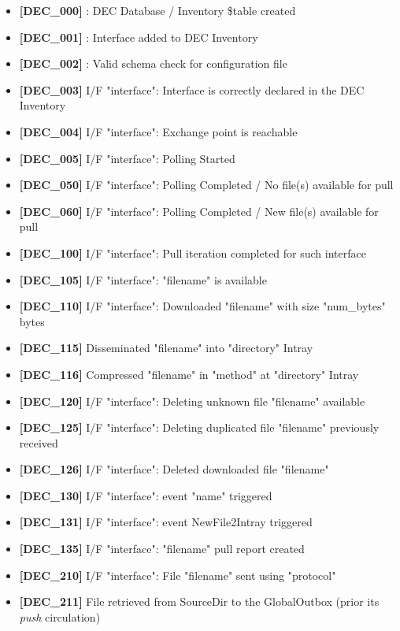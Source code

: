 \documentclass[dec_sum_main.tex]{subfiles}
\begin{document}
\begin{itemize}
    \item \textbf{[DEC\_000]} : DEC Database / Inventory \$table created
    \item \textbf{[DEC\_001]} : Interface added to DEC Inventory
	\item \textbf{[DEC\_002]} : Valid schema check for configuration file
	\item \textbf{[DEC\_003]} I/F "interface": Interface is correctly declared in the DEC Inventory
	\item \textbf{[DEC\_004]} I/F "interface": Exchange point is reachable
	\item \textbf{[DEC\_005]} I/F "interface": Polling Started
	\item \textbf{[DEC\_050]} I/F "interface": Polling Completed / No file(s) available for pull	
	\item \textbf{[DEC\_060]} I/F "interface": Polling Completed / New file(s) available for pull
	\item \textbf{[DEC\_100]} I/F "interface": Pull iteration completed for such interface
	\item \textbf{[DEC\_105]} I/F "interface": "filename" is available
	\item \textbf{[DEC\_110]} I/F "interface": Downloaded "filename" with size "num\_bytes" bytes
	\item \textbf{[DEC\_115]} Disseminated "filename" into "directory" Intray
	\item \textbf{[DEC\_116]} Compressed "filename" in "method" at "directory" Intray
	\item \textbf{[DEC\_120]} I/F "interface": Deleting unknown file "filename" available
	\item \textbf{[DEC\_125]} I/F "interface": Deleting duplicated file "filename" previously received 
	\item \textbf{[DEC\_126]} I/F "interface": Deleted downloaded file "filename"
	\item \textbf{[DEC\_130]} I/F "interface": event "name" triggered  	
	\item \textbf{[DEC\_131]} I/F "interface": event NewFile2Intray triggered
	\item \textbf{[DEC\_135]} I/F "interface": "filename" pull report created
	\item \textbf{[DEC\_210]} I/F "interface": File "filename" sent using "protocol"
	\item \textbf{[DEC\_211]} File retrieved from SourceDir to the GlobalOutbox (prior its \textit{push} circulation) 

\end{itemize}
\end{document}
